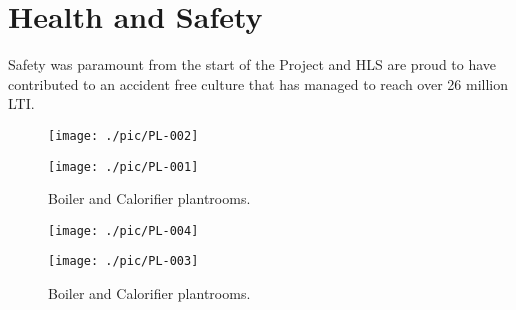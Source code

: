 \documentclass[oneside, justified, 11pt, a4paper]{tufte-book}
\begin{document}
\section{Health and Safety}
Safety was paramount from the start of the Project and HLS are proud to have contributed to an accident free culture that has managed to reach over 26 million LTI.


\begin{fullwidth}
\begin{figure*}[btp]
\texttt{[image: ./pic/PL-002]}
\vspace*{1pt}

\texttt{[image: ./pic/PL-001]}
\vspace*{1pt}

\caption{Boiler and Calorifier plantrooms.}
\end{figure*}
\end{fullwidth}

\newpage

\begin{fullwidth}
\begin{figure*}[btp]
\texttt{[image: ./pic/PL-004]}
\vspace*{1pt}

\texttt{[image: ./pic/PL-003]}
\vspace*{1pt}

\caption{Boiler and Calorifier plantrooms.}
\end{figure*}
\end{fullwidth}

\clearpage


\label{services}
\end{document}
